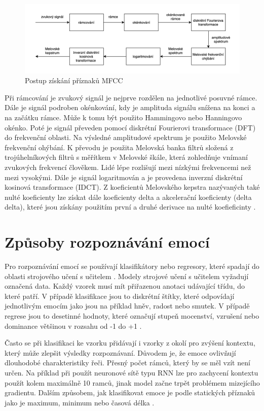\documentclass[FM,BP]{tulthesis}
\begin{document}
\begin{figure}[htbp]
\centerline{\includegraphics[width=\textwidth,height=\textheight,keepaspectratio]{mfcc_pipeline.png}}
\caption{Postup získání příznaků MFCC}
\label{fig:mfcc_pipeline}
\end{figure}
\FloatBarrier

Při rámcování je zvukový signál je nejprve rozdělen na jednotlivé posuvné rámce. Dále je signál podroben okénkování, kdy je amplituda signálu snížena na konci a na začátku rámce. Může k tomu být použito Hammingovo nebo Hanningovo okénko. Poté je signál převeden pomocí diskrétní Fourierovi transformace (DFT) do frekvenční oblasti. Na výsledné amplitudové spektrum je použito Melovské frekvenční ohýbání. K převodu je použita Melovská banka filtrů složená z trojúhelníkových filtrů s měřítkem v Melovské škále, která zohledňuje vnímaní zvukových frekvencí člověkem. Lidé lépe rozlišují mezi nízkými frekvencemi než mezi vysokými. Dále je signál logaritmován a je provedena inverzní diskrétní kosinová transformace (IDCT). Z koeficientů Melovského kepstra nazývaných také nulté koeficienty lze získat dále koeficienty delta a akcelerační koeficienty (delta delta), které jsou získány použitím první a druhé derivace na nulté koefieficinty \cite{mfcc}.

\section{Způsoby rozpoznávání emocí}
Pro rozpoznávání emocí se používají klasifikátory nebo regresory, které spadají do oblasti strojového učení s učitelem \cite{DBLP:journals/speech/AkcayO20}. Modely strojové učení s učitelem vyžadují označená data. Každý vzorek musí mít přiřazenou anotaci udávající třídu, do které patří. V případě klasifikace jsou to diskrétní štítky, které odpovídají jednotlivým emocím jako jsou na příklad hněv, radost nebo smutek. V případě regrese jsou to desetinné hodnoty, které označují stupeň mocenství, vzrušení nebo dominance většinou v rozsahu od -1 do +1 \cite{konar_chakraborty_2015}.

Často se při klasifikaci ke vzorku přidávají i vzorky z okolí pro zvýšení kontextu, který může zlepšit výsledky rozpoznávaní. Důvodem je, že emoce ovlivňují dlouhodobé charakteristiky řeči. Přesný počet rámců, který by se měl vzít není určen. Na příklad při použít neuronové sítě typu RNN lze pro zachycení kontextu použít kolem maximálně 10 ramců, jinak model začne trpět problémem mizejícího gradientu. Dalším způsobem, jak klasifikovat emoce je podle statických příznaků jako je maximum, minimum nebo časová délka \cite{konar_chakraborty_2015}.
\end{document}
